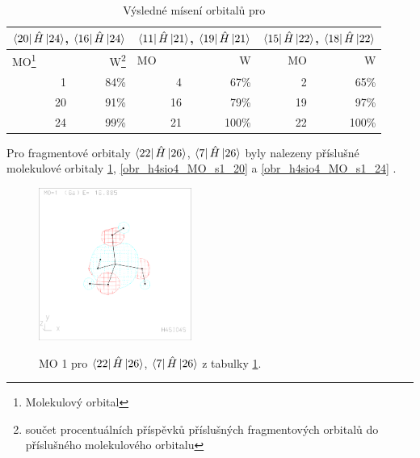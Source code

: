\documentclass[
  digital, %
  table,   %
  lof,     %
  lot,     %
]{fithesis3}
\begin{document}
\begin{table}[htbp]
\begin{minipage}{\textwidth}
\caption{Výsledné mísení orbitalů pro }
\begin{center}
\begin{tabular}{|r|r|r|r|r|r|}
\hline 
\multicolumn{2}{|c|}{$\bra{20}{\hat{H}}\ket{24}$, $\bra{16}{\hat{H}}\ket{24}$} & \multicolumn{2}{|c|}{$\bra{11}{\hat{H}}\ket{21}$, $\bra{19}{\hat{H}}\ket{21}$}& \multicolumn{2}{|c|}{$\bra{15}{\hat{H}}\ket{22}$, $\bra{18}{\hat{H}}\ket{22}$} \\
\hline \hline
\multicolumn{1}{|l|}{MO\footnote{Molekulový orbital} } & \multicolumn{1}{r|}{W\footnote{součet procentuálních příspěvků příslušných fragmentových orbitalů do příslušného molekulového orbitalu}} & \multicolumn{1}{l|}{MO} & \multicolumn{1}{r|}{W} & MO & \multicolumn{1}{r|}{W} \\ \hline
1 & 84\% & 4 & 67\% & 2 & 65\% \\ \hline
20 & 91\% & 16 & 79\% & 19 & 97\% \\ \hline
24 & 99\% & 21 & 100\% &  22& 100\% \\ \hline
\end{tabular}
\end{center}
\label{tab_h4sio4_vysledky}
\end{minipage}
\end{table}

    Pro fragmentové orbitaly $\bra{22}{\hat{H}}\ket{26}$, $\bra{7}{\hat{H}}\ket{26}$ byly nalezeny příslušné molekulové orbitaly \ref{obr_h4sio4_MO_s1_1}, \ref{obr_h4sio4_MO_s1_20} a \ref{obr_h4sio4_MO_s1_24} .
  
  \begin{figure}[h]
\caption{MO 1 pro $\bra{22}{\hat{H}}\ket{26}$, $\bra{7}{\hat{H}}\ket{26}$ z tabulky \ref{tab_h4sio4_vysledky}.  }
  \center
  \includegraphics[width=5cm]{h4sio4_obrazky/s1_1.eps}
  \label{obr_h4sio4_MO_s1_1}
  \end{figure}
\end{document}
